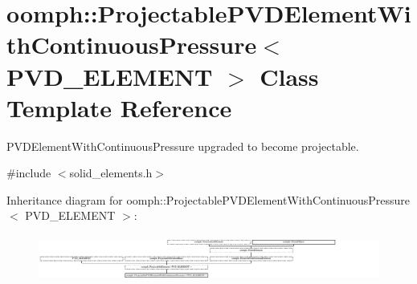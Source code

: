 \hypertarget{classoomph_1_1ProjectablePVDElementWithContinuousPressure}{}\section{oomph\+:\+:Projectable\+P\+V\+D\+Element\+With\+Continuous\+Pressure$<$ P\+V\+D\+\_\+\+E\+L\+E\+M\+E\+NT $>$ Class Template Reference}
\label{classoomph_1_1ProjectablePVDElementWithContinuousPressure}


P\+V\+D\+Element\+With\+Continuous\+Pressure upgraded to become projectable.  




{\ttfamily \#include $<$solid\+\_\+elements.\+h$>$}

Inheritance diagram for oomph\+:\+:Projectable\+P\+V\+D\+Element\+With\+Continuous\+Pressure$<$ P\+V\+D\+\_\+\+E\+L\+E\+M\+E\+NT $>$\+:\begin{figure}[H]
\begin{center}
\leavevmode
\includegraphics[height=1.555556cm]{classoomph_1_1ProjectablePVDElementWithContinuousPressure}
\end{center}
\end{figure}
